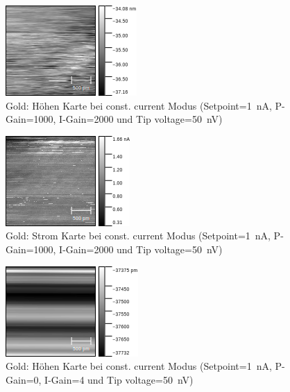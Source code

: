 \documentclass[sn-mathphys-num,iicol]{sn-jnl}
\theoremstyle{thmstyleone}
\theoremstyle{thmstyletwo}
\theoremstyle{thmstylethree}
\begin{document}
\begin{figure}[t]
        \centering
        \includegraphics[width=.5\textwidth]{../data/Graphit6_z.png}
        \caption{Gold: Höhen Karte bei const. current Modus (Setpoint=\SI{1}{\nano A}, P-Gain=\SI{1000}{}, I-Gain=\SI{2000}{} und Tip voltage=\SI{50}{\nano V})} \label{fig:gr6z}
\end{figure}
\begin{figure}[t]
        \centering
        \includegraphics[width=.5\textwidth]{../data/Graphit7_current.png}
        \caption{Gold: Strom Karte bei const. current Modus (Setpoint=\SI{1}{\nano A}, P-Gain=\SI{1000}{}, I-Gain=\SI{2000}{} und Tip voltage=\SI{50}{\nano V})} \label{fig:gr7c}
\end{figure}
\begin{figure}[t]
        \centering
        \includegraphics[width=.5\textwidth]{../data/Graphit7_z.png}
        \caption{Gold: Höhen Karte bei const. current Modus (Setpoint=\SI{1}{\nano A}, P-Gain=\SI{0}{}, I-Gain=\SI{4}{} und Tip voltage=\SI{50}{\nano V})} \label{fig:gr7z}
\end{figure}
\end{document}
